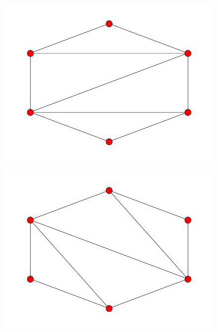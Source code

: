 \documentclass[fontsize=10pt]{article}
\begin{document}
\begin{figure}[hbtp]
\centering
\includegraphics[scale=0.5]{imgs/hexagon/hexagon_8.png}
\end{figure}

\begin{figure}[hbtp]
\centering
\includegraphics[scale=0.5]{imgs/hexagon/hexagon_9.png}
\end{figure}
\end{document}
